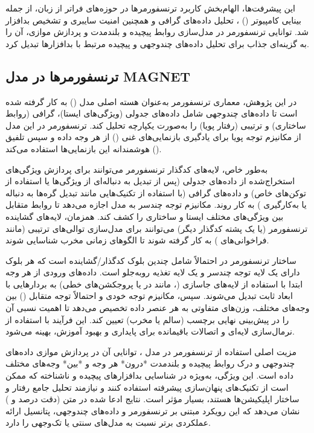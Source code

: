 این پیشرفت‌ها، الهام‌بخش کاربرد ترنسفورمرها در حوزه‌های فراتر از زبان، از جمله بینایی کامپیوتر () \cite{Dosovitskiy2021}، تحلیل داده‌های گرافی \cite{Yun2019} و همچنین امنیت سایبری و تشخیص بدافزار \cite{TransformerMalware} شد. توانایی ترنسفورمر در مدل‌سازی روابط پیچیده و بلندمدت و پردازش موازی، آن را به گزینه‌ای جذاب برای تحلیل داده‌های چندوجهی و پیچیده مرتبط با بدافزارها تبدیل کرد.

\subsection{ترنسفورمرها در مدل MAGNET}
در این پژوهش، معماری ترنسفورمر به‌عنوان هسته اصلی مدل  () به کار گرفته شده است تا داده‌های چندوجهی شامل داده‌های جدولی (ویژگی‌های ایستا)، گرافی (روابط ساختاری) و ترتیبی (رفتار پویا) را به‌صورت یکپارچه تحلیل کند. ترنسفورمر در این مدل از مکانیزم توجه پویا برای یادگیری بازنمایی‌های غنی () از هر وجه داده و سپس تلفیق () هوشمندانه این بازنمایی‌ها استفاده می‌کند.

به‌طور خاص، لایه‌های کدگذار ترنسفورمر می‌توانند برای پردازش ویژگی‌های استخراج‌شده از داده‌های جدولی (پس از تبدیل به دنباله‌ای از ویژگی‌ها یا استفاده از توکن‌های خاص) و داده‌های گرافی (با استفاده از تکنیک‌هایی مانند تبدیل گره‌ها به دنباله یا به‌کارگیری ) به کار روند. مکانیزم توجه چندسر به مدل اجازه می‌دهد تا روابط متقابل بین ویژگی‌های مختلف ایستا و ساختاری را کشف کند. همزمان، لایه‌های گشاینده ترنسفورمر (یا یک پشته کدگذار دیگر) می‌توانند برای مدل‌سازی توالی‌های ترتیبی (مانند فراخوانی‌های ) به کار گرفته شوند تا الگوهای زمانی مخرب شناسایی شوند.

ساختار ترنسفورمر در  احتمالاً شامل چندین بلوک کدگذار/گشاینده است که هر بلوک دارای یک لایه توجه چندسر و یک لایه تغذیه روبه‌جلو است. داده‌های ورودی از هر وجه ابتدا با استفاده از لایه‌های جاسازی (، مانند  در  یا پروجکشن‌های خطی) به بردارهایی با ابعاد ثابت تبدیل می‌شوند. سپس، مکانیزم توجه خودی و احتمالاً توجه متقابل () بین وجه‌های مختلف، وزن‌های متفاوتی به هر عنصر داده تخصیص می‌دهد تا اهمیت نسبی آن را در پیش‌بینی نهایی برچسب (سالم یا مخرب) تعیین کند. این فرآیند با استفاده از نرمال‌سازی لایه‌ای و اتصالات باقیمانده برای پایداری و بهبود آموزش، بهینه می‌شود.

مزیت اصلی استفاده از ترنسفورمر در مدل ، توانایی آن در پردازش موازی داده‌های چندوجهی و درک روابط پیچیده و بلندمدت *درون* هر وجه و *بین* وجه‌های مختلف داده است. این ویژگی، به‌ویژه در شناسایی بدافزارهای پیچیده و ناشناخته که ممکن است از تکنیک‌های پنهان‌سازی پیشرفته استفاده کنند و نیازمند تحلیل جامع رفتار و ساختار اپلیکیشن‌ها هستند، بسیار مؤثر است. نتایج ادعا شده در متن (دقت  درصد و  ) نشان می‌دهد که این رویکرد مبتنی بر ترنسفورمر و داده‌های چندوجهی، پتانسیل ارائه عملکردی برتر نسبت به مدل‌های سنتی یا تک‌وجهی را دارد.

